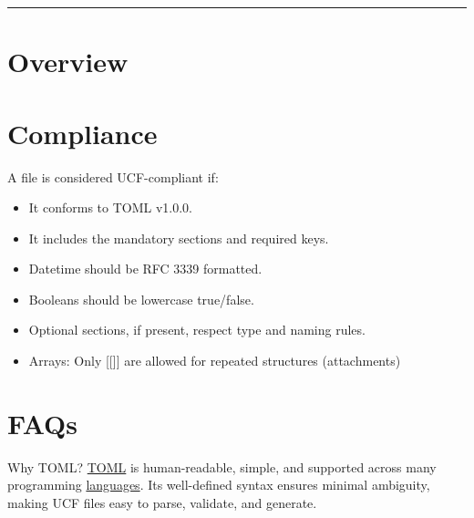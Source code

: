 \documentclass[12pt]{spec}
\begin{document}
\specheader
\bigskip
\hrule


\section{Overview}









\section{Compliance}

A file is considered UCF-compliant if:

\begin{itemize}
  \item It conforms to TOML v1.0.0.
  \item It includes the mandatory sections and required keys.
  \item Datetime should be RFC 3339 formatted.
  \item Booleans should be lowercase true/false.
  \item Optional sections, if present, respect type and naming rules.
  \item Arrays: Only [[]] are allowed for repeated structures (attachments)
\end{itemize}

\section{FAQs}

\begin{specpara}{Why TOML?}
\href{https://toml.io/en}{TOML} is human-readable, simple, and supported across many
programming \href{https://github.com/toml-lang/toml/wiki}{languages}. Its 
well-defined syntax ensures minimal ambiguity, making UCF files easy to parse, 
validate, and generate.
\end{specpara}
\end{document}
